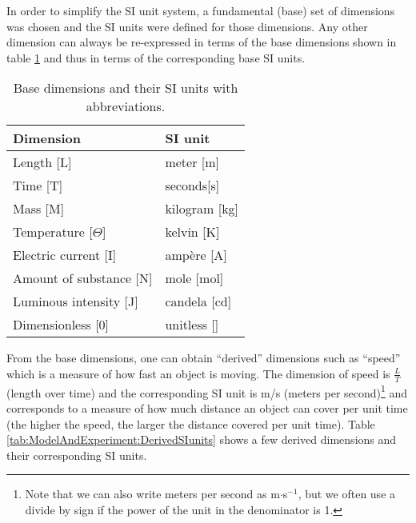 In order to simplify the SI unit system, a fundamental (base) set of dimensions was chosen and the SI units were defined for those dimensions. Any other dimension can always be re-expressed in terms of the base dimensions shown in table \ref{tab:ModelAndExperiment:SIunits} and thus in terms of the corresponding base SI units.

\begin{table}[!h]
\centering
\begin{tabular}{ll }
\textbf{Dimension}&\textbf{SI unit}\\
\hline
\hline
Length [L]& meter [m]\\ \hline
Time [T]& seconds[s] \\ \hline
Mass [M]& kilogram [kg]\\ \hline
Temperature [$\Theta$]& kelvin [K] \\ \hline
Electric current [I]& amp\`ere [A]\\ \hline
Amount of substance [N]& mole [mol] \\ \hline
Luminous intensity [J]& candela [cd] \\ \hline
Dimensionless [0]& unitless [] \\ \hline
\end{tabular}
\caption{\label{tab:ModelAndExperiment:SIunits} Base dimensions and their SI units with abbreviations.}
\end{table}

From the base dimensions, one can obtain ``derived'' dimensions such as ``speed'' which is a measure of how fast an object is moving. The dimension of speed is $\frac{L}{T}$ (length over time) and the corresponding SI unit is m/s (meters per second)\footnote{Note that we can also write meters per second as m$\cdot$s$^{-1}$, but we often use a divide by sign if the power of the unit in the denominator is 1.} and corresponds to a measure of how much distance an object can cover per unit time (the higher the speed, the larger the distance covered per unit time). Table \ref{tab:ModelAndExperiment:DerivedSIunits} shows a few derived dimensions and their corresponding SI units.

